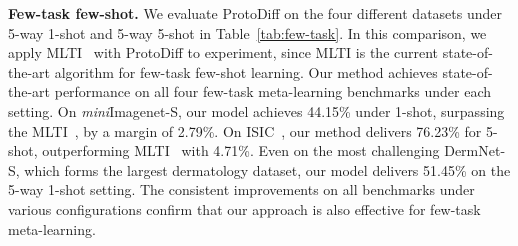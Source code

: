 \textbf{Few-task few-shot.}
We evaluate ProtoDiff on the four different datasets under 5-way 1-shot and 5-way 5-shot in Table~\ref{tab:few-task}. In this comparison, we apply MLTI~\cite{yao2021meta} with ProtoDiff to experiment, since MLTI is the current state-of-the-art algorithm for few-task few-shot learning.
Our method achieves state-of-the-art performance on all four few-task meta-learning benchmarks under each setting.  On \textit{mini}Imagenet-S, our model achieves 44.15\% under 1-shot, surpassing the 
MLTI~\cite{yao2021meta}, by a margin of 2.79\%.   On ISIC~\cite{milton2019automated}, our method delivers 76.23\% for 5-shot, outperforming MLTI~\cite{yao2021meta} with 4.71\%. 
Even on the most challenging DermNet-S, which forms the largest dermatology dataset, our model delivers 51.45\% on the 5-way 1-shot setting. The consistent improvements on all benchmarks under various configurations confirm that our approach is also effective for few-task meta-learning.

